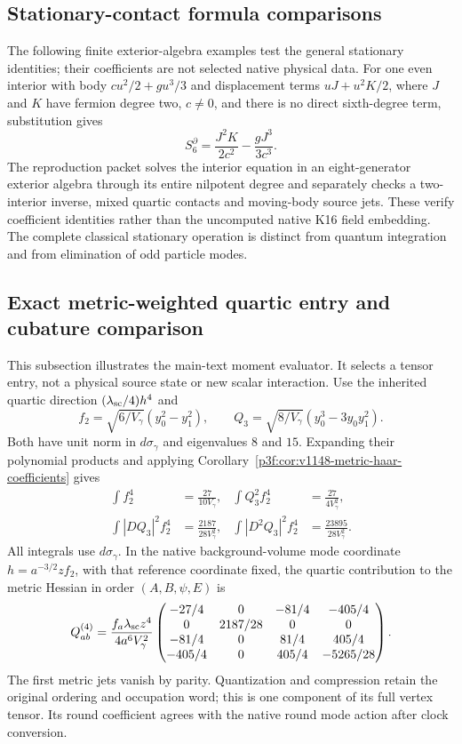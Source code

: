 \documentclass[11pt,a4paper]{article}
\begin{document}
\subsection{Stationary-contact formula comparisons}
\label{p3f:v2171:app:stationarychecks}
The following finite exterior-algebra examples test the general stationary
identities; their coefficients are not selected native physical data.
For one even interior with body $cu^2/2+gu^3/3$ and displacement terms
$uJ+u^2K/2$, where $J$ and $K$ have fermion degree two, $c\ne0$, and
there is no direct sixth-degree term, substitution gives
\[
 S^\partial_6=\frac{J^2K}{2c^2}-\frac{gJ^3}{3c^3}.
\]
The reproduction packet solves the interior equation in an eight-generator
exterior algebra through its entire nilpotent degree and separately checks
a two-interior inverse, mixed quartic contacts and moving-body source jets.
These verify coefficient identities rather than the uncomputed native
K16 field embedding. The complete classical stationary operation is
distinct from quantum integration and from elimination of odd particle modes.





\subsection{Exact metric-weighted quartic entry and cubature comparison}
\label{p3f:app:v1148-metric-quartic-entry}
This subsection illustrates the main-text moment evaluator. It selects a
tensor entry, not a physical source state or new scalar interaction.
Use the inherited quartic direction $(\lambda_{\rm sc}/4)h^4$ and
\[
 f_2=\sqrt{6/V_\gamma}(y_0^2-y_1^2),\qquad
 Q_3=\sqrt{8/V_\gamma}(y_0^3-3y_0y_1^2).
\]
Both have unit norm in $d\sigma_\gamma$ and eigenvalues $8$ and $15$.
Expanding their polynomial products and applying
Corollary~\ref{p3f:cor:v1148-metric-haar-coefficients} gives
\begin{align*}
 \int f_2^4&=\frac{27}{10V_\gamma},&
 \int Q_3^2f_2^4&=\frac{27}{4V_\gamma^2},\\
 \int|DQ_3|^2f_2^4&=\frac{2187}{28V_\gamma^2},&
 \int|D^2Q_3|^2f_2^4&=\frac{23895}{28V_\gamma^2}.
\end{align*}
All integrals use $d\sigma_\gamma$. In the native background-volume mode
coordinate $h=a^{-3/2}zf_2$, with that reference coordinate fixed, the
quartic contribution to the metric Hessian in order $(A,B,\psi,E)$ is
\[
 Q_{ab}^{(4)}=\frac{f_a\lambda_{\rm sc}z^4}{4a^6V_\gamma^2}
 \begin{pmatrix}
 -27/4&0&-81/4&-405/4\\
 0&2187/28&0&0\\
 -81/4&0&81/4&405/4\\
 -405/4&0&405/4&-5265/28
 \end{pmatrix}.
\]
The first metric jets vanish by parity. Quantization and compression retain
the original ordering and occupation word; this is one component of its
full vertex tensor. Its round coefficient agrees with the native round
mode action after clock conversion.
\end{document}
